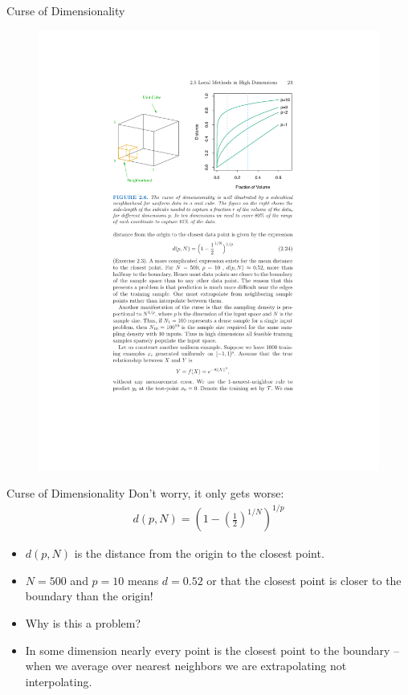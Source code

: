 \begin{frame}{Curse of Dimensionality}
  \begin{figure}[htbp]
  \begin{center}
  \includegraphics[width=\textwidth]{./resources/figure26.pdf}
  \label{class15nn}
  \end{center}
  \end{figure}
\end{frame}
  
\begin{frame}{Curse of Dimensionality}
  Don't worry, it only gets worse:
  \begin{eqnarray*}
  d(p,N) = \left(1-\left(\frac{1}{2} \right)^{1/N} \right)^{1/p}
  \end{eqnarray*}
  
  \begin{itemize}
  \item $d(p,N)$ is the distance from the origin to the closest point.
  \item $N=500$ and $p=10$ means $d = 0.52$ or that the closest point is closer to the boundary than the origin!
  \item Why is this a problem?
  \item In some dimension nearly every point is the closest point to the boundary -- when we average over nearest neighbors we are \alert{extrapolating} not \alert{interpolating}.
  \end{itemize}
\end{frame}
  
